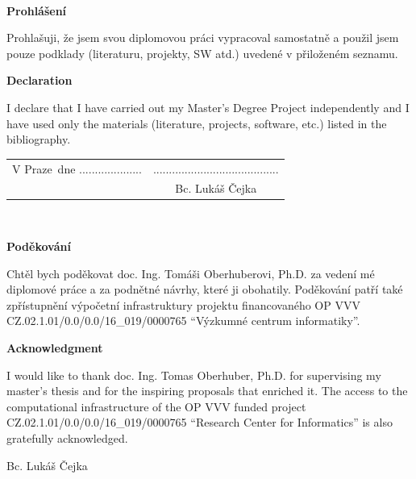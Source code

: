 \documentclass[a4paper, twoside, 12pt, czech, american]{book}
\newcommand{\paperAuthor}{Bc. Lukáš Čejka}   				 %
\newcommand{\place}{Praze} 									 %
\newcommand{\declarationCZ}{Prohlašuji, že jsem svou diplomovou práci vypracoval samostatně a použil jsem pouze podklady (literaturu, projekty, SW atd.) uvedené v přiloženém seznamu.}
\newcommand{\declarationEN}{I declare that I have carried out my Master's Degree Project independently and I have used only the materials (literature, projects, software, etc.) listed in the bibliography.}
\newcommand{\acknowledgementCZ}{Chtěl bych poděkovat doc. Ing. Tomáši Oberhuberovi, Ph.D. za vedení mé diplomové práce a za podnětné návrhy, které ji obohatily. Poděkování patří také zpřístupnění výpočetní infrastruktury projektu financovaného OP VVV CZ.02.1.01/0.0/0.0/16\_019/0000765 ``Výzkumné centrum informatiky''.}
\newcommand{\acknowledgementEN}{I would like to thank doc. Ing. Tomas Oberhuber, Ph.D. for supervising my master's thesis and for the inspiring proposals that enriched it. The access to the computational infrastructure of the OP VVV funded project CZ.02.1.01/0.0/0.0/16\_019/0000765 ``Research Center for Informatics'' is also gratefully acknowledged.}
\begin{document}
~ 					  %
\vfill 				  %

\textbf{Prohlášení}   %

\vspace{1em} 		  %
\declarationCZ

%
\vspace{1em}
\textbf{Declaration}

\vspace{1em}
\declarationEN
{}%

\vspace{2em}  									 							    	%
\hspace{-0.5em}\begin{tabularx}{\textwidth}{X c} 							    	%
	V \place\ dne .................... &........................................ \\ %
	& \paperAuthor
\end{tabularx}




\newpage
\thispagestyle{empty}

~
\vfill %

\textbf{Poděkování}

\vspace{1em} 				%
\acknowledgementCZ

%
\vspace{1em}
\textbf{Acknowledgment}

%
\vspace{1em} 				%
\acknowledgementEN
\begin{flushright}
	\paperAuthor
\end{flushright}  			%




\newpage   			  %
\thispagestyle{empty} %

\newbox\odstavecbox
\newlength\vyskaodstavce
\newcommand\odstavec[2]{%
	\setbox\odstavecbox=\hbox{%
		\parbox[t]{#1}{#2\vrule width 0pt depth 4pt}}%
	\global\vyskaodstavce=\dp\odstavecbox
	\box\odstavecbox}
\newcommand{\delka}{120mm} %
\end{document}
